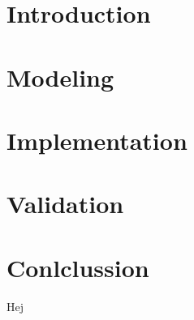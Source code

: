 \documentclass[11pt,a4paper,fleqn]{article}
\begin{document}

\newpage

\tableofcontents
\newpage


\section{Introduction}%
\label{sec:introduction}


\section{Modeling}%
\label{sec:modeling}


\section{Implementation}%
\label{sec:implementation}


\section{Validation}%
\label{sec:validation}


\section{Conlclussion}%
\label{sec:conlclussion}



Hej ~\cite{Nobody06}

{}

\end{document}
